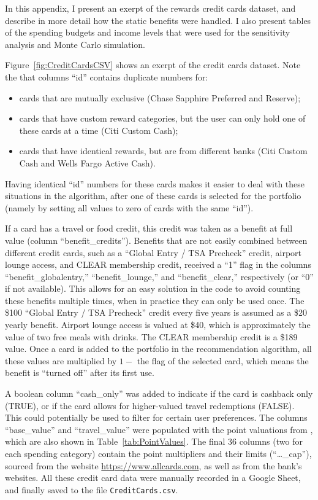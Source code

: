 In this appendix, I present an exerpt of the rewards credit cards dataset, and describe in more detail how the static benefits were handled. 
I also present tables of the spending budgets and income levels that were used for the sensitivity analysis and Monte Carlo simulation. 

Figure~\ref{fig:CreditCardsCSV} shows an exerpt of the credit cards dataset. 
Note the that columns ``id'' contains duplicate numbers for:
\begin{itemize}
    \item cards that are mutually exclusive (Chase Sapphire Preferred and Reserve);
    \item cards that have custom reward categories, but the user can only hold one of these cards at a time (Citi Custom Cash);
    \item cards that have identical rewards, but are from different banks (Citi Custom Cash and Wells Fargo Active Cash).
\end{itemize}
Having identical ``id'' numbers for these cards makes it easier to deal with these situations in the algorithm, after one of these cards is selected for the portfolio (namely by setting all values to zero of cards with the same ``id'').

If a card has a travel or food credit, this credit was taken as a benefit at full value (column ``benefit\_credits''). Benefits that are not easily combined between different credit cards, such as a ``Global Entry / TSA Precheck'' credit, airport lounge access, and CLEAR membership credit, received a ``1'' flag in the columns ``benefit\_globalentry,'' ``benefit\_lounge,'' and ``benefit\_clear,'' respectively (or ``0'' if not available). 
This allows for an easy solution in the code to avoid counting these benefits multiple times, when in practice they can only be used once. 
The \$100 ``Global Entry / TSA Precheck'' credit every five years is assumed as a \$20 yearly benefit. Airport lounge access is valued at \$40, which is approximately the value of two free meals with drinks. 
The CLEAR membership credit is a \$189 value. 
Once a card is added to the portfolio in the recommendation algorithm, all these values are multiplied by $1-$ the flag of the selected card, which means the benefit is ``turned off'' after its first use. 

A boolean column ``cash\_only'' was added to indicate if the card is cashback only (TRUE), or if the card allows for higher-valued travel redemptions (FALSE).
This could potentially be used to filter for certain user preferences.
The columns ``base\_value'' and ``travel\_value'' were populated with the point valuations from \citet{nerdwallet:2024}, which are also shown in Table~\ref{tab:PointValues}.
The final 36 columns (two for each spending category) contain the point multipliers and their limits (``\ldots\_cap''), sourced from the website \url{https://www.allcards.com}, as well as from the bank's websites. 
All these credit card data were manually recorded in a Google Sheet, and finally saved to the file \texttt{CreditCards.csv}. 


